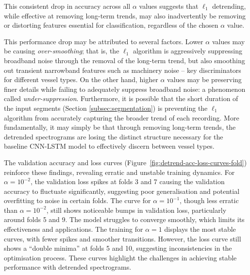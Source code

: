 This consistent drop in accuracy across all $\alpha$ values suggests that $\ell_1$ detrending, while effective at removing long-term trends, may also inadvertently be removing  or distorting features essential for classification, regardless of the chosen $\alpha$ value.

This performance drop may be attributed to several factors. Lower $\alpha$ values may be causing \textit{over-smoothing}; that is, the $\ell_1$ algorithm is aggressively suppressing broadband noise through the removal of the long-term trend, but also smoothing out transient narrowband features such as machinery noise -- key discriminators for different vessel types. On the other hand, higher $\alpha$ values may be preserving finer details while failing to adequately suppress broadband noise: a phenomenon called \textit{under-suppression}. Furthermore, it is possible that the short duration of the input segments (Section \ref{subsec:segmentation}) is preventing the $\ell_1$ algorithm from accurately capturing the broader trend of each recording. More fundamentally, it may simply be that through removing long-term trends, the detrended spectrograms are losing the distinct structure necessary for the baseline CNN-LSTM model to effectively discern between vessel types. 

The validation accuracy and loss curves (Figure~\ref{fig:detrend-acc-loss-curves-fold}) reinforce these findings, revealing erratic and unstable training dynamics. For $\alpha = 10^{-2}$, the validation loss spikes at folds 3 and 7 causing the validation accuracy to fluctuate significantly, suggesting poor generalisation and potential overfitting to noise in certain folds. The curve for $\alpha = 10^{-1}$, though less erratic than $\alpha = 10^{-2}$, still shows noticeable bumps in validation loss, particularly around folds 5 and 9. The model struggles to converge smoothly, which limits its effectiveness and applications. The training for $\alpha = 1$ displays the most stable curves, with fewer spikes and smoother transitions. However, the loss curve still shows a ``double minima'' at folds 5 and 10, suggesting inconsistencies in the optimisation process. These curves highlight the challenges in achieving stable performance with detrended spectrograms.

